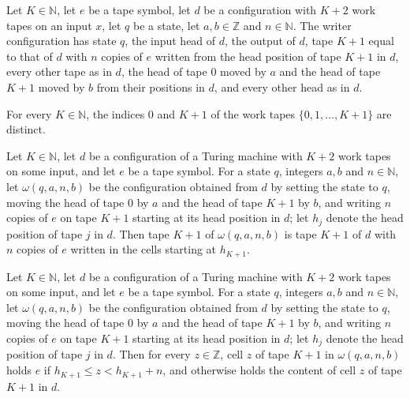 \begin{definition}
\label{Turing.cw_cfg}
\leanok
{}
Let $K\in\mathbb{N}$, let $e$ be a tape symbol, let $d$ be a configuration with $K+2$ work
tapes on an input $x$, let $q$ be a state, let $a,b\in\mathbb{Z}$ and $n\in\mathbb{N}$. The
writer configuration has state $q$, the input head of $d$, the output of $d$, tape $K+1$ equal
to that of $d$ with $n$ copies of $e$ written from the head position of tape $K+1$ in $d$,
every other tape as in $d$, the head of tape $0$ moved by $a$ and the head of tape $K+1$ moved
by $b$ from their positions in $d$, and every other head as in $d$.
\end{definition}

\begin{lemma}
\label{Turing.cw_zero_ne_last}
\leanok
{}
For every $K\in\mathbb{N}$, the indices $0$ and $K+1$ of the work tapes $\{0,1,\dots,K+1\}$ are
distinct.
\end{lemma}

\begin{lemma}
\label{Turing.cw_cfg_clockTape}
\leanok
{}
Let $K\in\mathbb{N}$, let $d$ be a configuration of a Turing machine with $K+2$ work tapes on
some input, and let $e$ be a tape symbol. For a state $q$, integers $a,b$ and $n\in\mathbb{N}$,
let $\omega(q,a,n,b)$ be the configuration obtained from $d$ by setting the state to $q$,
moving the head of tape $0$ by $a$ and the head of tape $K+1$ by $b$, and writing $n$ copies of
$e$ on tape $K+1$ starting at its head position in $d$; let $h_j$ denote the head position of
tape $j$ in $d$. Then tape $K+1$ of $\omega(q,a,n,b)$ is tape $K+1$ of $d$ with $n$ copies of
$e$ written in the cells starting at $h_{K+1}$.
\end{lemma}

\begin{lemma}
\label{Turing.cw_cfg_clock}
\leanok
{}
Let $K\in\mathbb{N}$, let $d$ be a configuration of a Turing machine with $K+2$ work tapes on
some input, and let $e$ be a tape symbol. For a state $q$, integers $a,b$ and $n\in\mathbb{N}$,
let $\omega(q,a,n,b)$ be the configuration obtained from $d$ by setting the state to $q$,
moving the head of tape $0$ by $a$ and the head of tape $K+1$ by $b$, and writing $n$ copies of
$e$ on tape $K+1$ starting at its head position in $d$; let $h_j$ denote the head position of
tape $j$ in $d$. Then for every $z\in\mathbb{Z}$, cell $z$ of tape $K+1$ in $\omega(q,a,n,b)$
holds $e$ if $h_{K+1}\le z<h_{K+1}+n$, and otherwise holds the content of cell $z$ of tape
$K+1$ in $d$.
\end{lemma}

